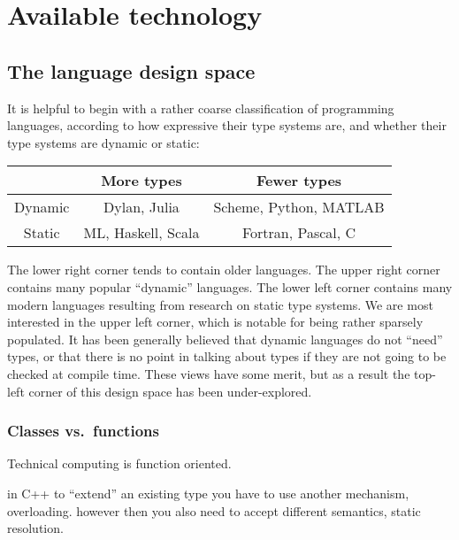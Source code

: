 \chapter{Available technology}

\section{The language design space}


It is helpful to begin with a rather coarse classification of programming
languages, according to how expressive their type systems are, and whether
their type systems are dynamic or static:

\vspace{3ex}

\begin{tabular}{|c||c|c|}
\hline 
 & More types & Fewer types\tabularnewline
\hline 
\hline 
Dynamic & Dylan, Julia & Scheme, Python, MATLAB\tabularnewline
\hline 
Static & ML, Haskell, Scala & Fortran, Pascal, C\tabularnewline
\hline 
\end{tabular}

\vspace{3ex}

The lower right corner tends to contain older languages.
The upper right corner contains many popular ``dynamic'' languages.
The lower left corner contains many modern languages resulting from research
on static type systems.
We are most interested in the upper left corner, which is notable for being
rather sparsely populated.
It has been generally believed that dynamic languages do not ``need'' types,
or that there is no point in talking about types if they are not going to be
checked at compile time.
These views have some merit, but as a result the top-left corner of this design
space has been under-explored.

\subsection{Classes vs.\ functions}

Technical computing is function oriented.

in C++ to ``extend'' an existing type you have to use another mechanism,
overloading.
however then you also need to accept different semantics, static resolution.


